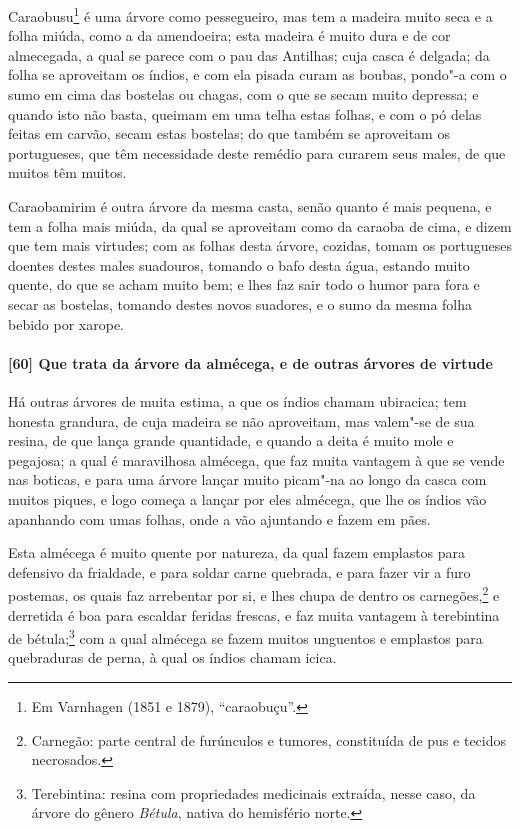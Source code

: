 Caraobusu\footnote{ Em Varnhagen (1851 e 1879), ``caraobuçu''.} é uma árvore como
pessegueiro, mas tem a madeira muito seca e a folha miúda, como a da amendoeira; esta
madeira é muito dura e de cor almecegada, a qual se parece com o pau das Antilhas; cuja
casca é delgada; da folha se aproveitam os índios, e com ela pisada curam as boubas,
pondo"-a com o sumo em cima das bostelas ou chagas, com o que se secam muito depressa; e
quando isto não basta, queimam em uma telha estas folhas, e com o pó delas feitas em
carvão, secam estas bostelas; do que também se aproveitam os portugueses, que têm
necessidade deste remédio para curarem seus males, de que muitos têm muitos.

Caraobamirim é outra árvore da mesma casta, senão quanto é mais pequena, e tem a folha
mais miúda, da qual se aproveitam como da caraoba de cima, e dizem que tem mais virtudes;
com as folhas desta árvore, cozidas, tomam os portugueses doentes destes males suadouros,
tomando o bafo desta água, estando muito quente, do que se acham muito bem; e lhes faz
sair todo o humor para fora e secar as bostelas, tomando destes novos suadores, e o sumo
da mesma folha bebido por xarope.

\paragraph{[60] Que trata da árvore da almécega, e de outras árvores de virtude}\quad
Há outras árvores de muita estima, a que os índios chamam ubiracica; tem honesta grandura,
de cuja madeira se não aproveitam, mas valem"-se de sua resina, de que lança grande
quantidade, e quando a deita é muito mole e pegajosa; a qual é maravilhosa almécega, que
faz muita vantagem à que se vende nas boticas, e para uma árvore lançar muito picam"-na ao
longo da casca com muitos piques, e logo começa a lançar por eles almécega, que lhe os
índios vão apanhando com umas folhas, onde a vão ajuntando e fazem em pães.

Esta almécega é muito quente por natureza, da qual fazem emplastos para defensivo da
frialdade, e para soldar carne quebrada, e para fazer vir a furo postemas, os quais faz
arrebentar por si, e lhes chupa de dentro os carnegões,\footnote{ Carnegão: parte central
de furúnculos e tumores, constituída de pus e tecidos necrosados.} e derretida é boa para
escaldar feridas frescas, e faz muita vantagem à terebintina de bétula;\footnote{
Terebintina: resina com propriedades medicinais extraída, nesse caso, da árvore do gênero
\textit{Bétula}, nativa do hemisfério norte.} com a qual almécega se fazem muitos
unguentos e emplastos para quebraduras de perna, à qual os índios chamam icica.

